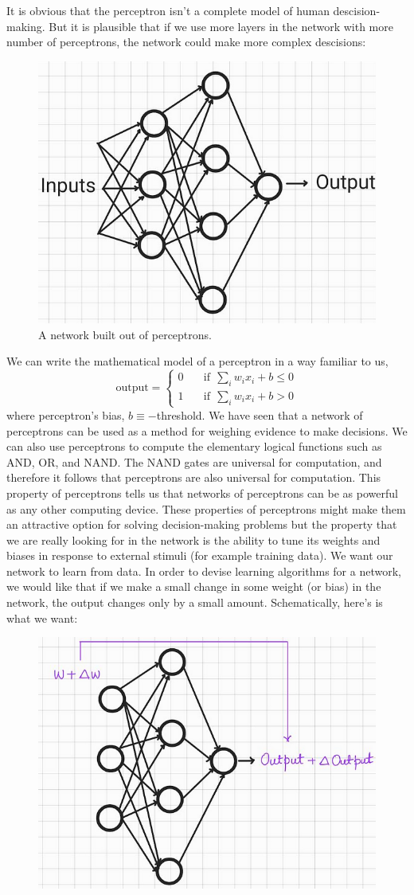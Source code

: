 It is obvious that the perceptron isn't a complete model of human descision-making. But it is plausible that if we use more layers in the network
with more number of perceptrons, the network could make more complex descisions:
\begin{figure}[htbp]
    \centering
    \includegraphics[width=.4\textwidth]{Figures/perceptron_network.png}
    \caption{A network built out of perceptrons.}
    \label{fig:percep_net}
\end{figure} 
We can write the mathematical model of a perceptron in a way familiar to us, 
\begin{equation*}
    \text{output} = 
     \begin{cases}
       0 &\quad \text{if} \ \ \sum_i w_i x_i + b \leq 0 \\
       1 &\quad  \text{if} \ \ \sum_i w_i x_i + b > 0 
     \end{cases}
\end{equation*}
where perceptron's bias, $b \equiv -$threshold. We have seen that a network of perceptrons can be used as 
a method for weighing evidence to make decisions. We can also use perceptrons to compute the elementary logical functions such as
AND, OR, and NAND. The NAND gates are universal for computation, and therefore it follows that perceptrons are also universal for
computation. This property of perceptrons tells us that networks of perceptrons can be as powerful as any other computing device. These 
properties of perceptrons might make them an attractive option for solving decision-making problems but the property that we 
are really looking for in the network is the ability to tune its weights and biases in response to external stimuli (for example training data).
We want our network to learn from data. In order to devise learning algorithms for a network, we would like that if we make 
a small change in some weight (or bias) in the network, the output changes only by a small amount. Schematically, here's is what we want:
\begin{figure}[htbp]
    \centering
    \includegraphics[width=.4\textwidth]{Figures/precepnet2.png}
\end{figure}
 
